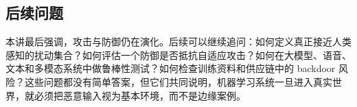 \documentclass[a4paper]{article}
\begin{document}
\subsection{后续问题}

本讲最后强调，攻击与防御仍在演化。后续可以继续追问：如何定义真正接近人类感知的扰动集合？如何评估一个防御是否抵抗自适应攻击？如何在大模型、语音、文本和多模态系统中做鲁棒性测试？如何检查训练资料和供应链中的 backdoor 风险？这些问题都没有简单答案，但它们共同说明，机器学习系统一旦进入真实世界，就必须把恶意输入视为基本环境，而不是边缘案例。
\end{document}
